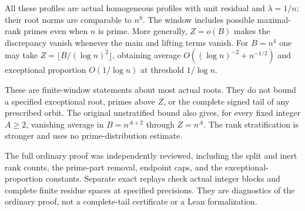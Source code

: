 All these profiles are actual homogeneous profiles with unit residual
and $\lambda=1/n$; their root norms are comparable to $n^8$. The
window includes possible maximal-rank primes even when $n$ is prime.
More generally, $Z=o(B)$ makes the discrepancy vanish whenever the
main and lifting terms vanish. For $B=n^4$ one may take
$Z=\lfloor B/(\log n)^2\rfloor$, obtaining average
$O((\log n)^{-2}+n^{-1/2})$ and exceptional proportion $O(1/\log n)$
at threshold $1/\log n$.

These are finite-window statements about most actual roots. They do
not bound a specified exceptional root, primes above $Z$, or the
complete signed tail of any prescribed orbit. The original
unstratified bound also gives, for every fixed integer $A\ge2$,
vanishing average in $B=n^{A+2}$ through $Z=n^A$. The rank
stratification is stronger and uses no prime-distribution estimate.

The full ordinary proof was independently reviewed, including the
split and inert rank counts, the prime-part removal, endpoint caps,
and the exceptional-proportion constants. Separate exact replays
check actual integer blocks and complete finite residue spaces at
specified precisions. They are diagnostics of the ordinary proof,
not a complete-tail certificate or a Lean formalization.

